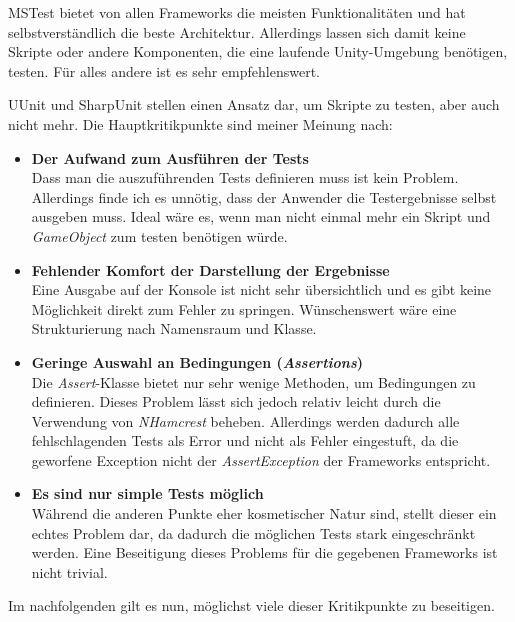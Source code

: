 MSTest bietet von allen Frameworks die meisten Funktionalitäten und hat selbstverständlich die beste Architektur. Allerdings lassen sich damit keine Skripte oder andere Komponenten, die eine laufende Unity-Umgebung benötigen, testen. Für alles andere ist es sehr empfehlenswert.

UUnit und SharpUnit stellen einen Ansatz dar, um Skripte zu testen, aber auch nicht mehr. Die Hauptkritikpunkte sind meiner Meinung nach:
\begin{itemize}
\item \textbf{Der Aufwand zum Ausführen der Tests}\\
Dass man die auszuführenden Tests definieren muss ist kein Problem. Allerdings finde ich es unnötig, dass der Anwender die Testergebnisse selbst ausgeben muss. Ideal wäre es, wenn man nicht einmal mehr ein Skript und \textit{GameObject} zum testen benötigen würde.
\item \textbf{Fehlender Komfort der Darstellung der Ergebnisse}\\
Eine Ausgabe auf der Konsole ist nicht sehr übersichtlich und es gibt keine Möglichkeit direkt zum Fehler zu springen. Wünschenswert wäre eine Strukturierung nach Namensraum und Klasse.
\item \textbf{Geringe Auswahl an Bedingungen (\textit{Assertions})}\\
Die \textit{Assert}-Klasse bietet nur sehr wenige Methoden, um Bedingungen zu definieren. Dieses Problem lässt sich jedoch relativ leicht durch die Verwendung von \textit{NHamcrest} beheben. Allerdings werden dadurch alle fehlschlagenden Tests als Error und nicht als Fehler eingestuft, da die geworfene Exception nicht der \textit{AssertException} der Frameworks entspricht.
\item \textbf{Es sind nur simple Tests möglich}\\
Während die anderen Punkte eher kosmetischer Natur sind, stellt dieser ein echtes Problem dar, da dadurch die möglichen Tests stark eingeschränkt werden. Eine Beseitigung dieses Problems für die gegebenen Frameworks ist nicht trivial.
\end{itemize}

Im nachfolgenden gilt es nun, möglichst viele dieser Kritikpunkte zu beseitigen.